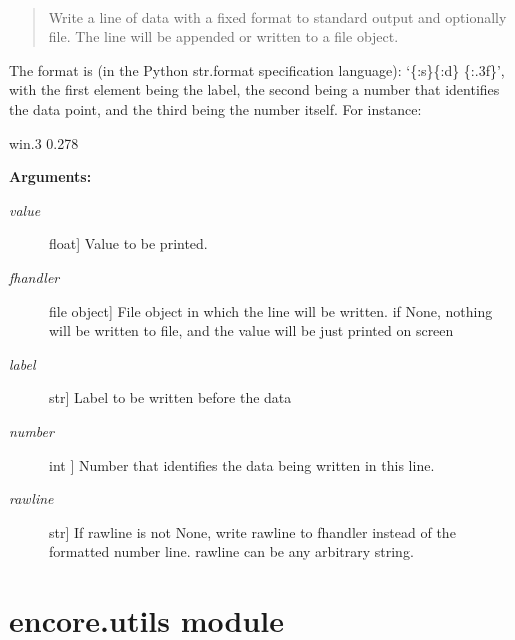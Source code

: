 \documentclass[letterpaper,10pt,english]{sphinxmanual}
\begin{document}

\begin{fulllineitems}
\label{index:encore.similarity.write_output_line}~\begin{quote}

Write a line of data with a fixed format to standard output and optionally file. The line will be appended or written to a file object.
\end{quote}

The format is (in the Python str.format specification language): `\{:s\}\{:d\}      \{:.3f\}', with the first element being the label, the second being
a number that identifies the data point, and the third being the number itself. For instance:

win.3   0.278

\textbf{Arguments:}
\begin{description}
\item[{\emph{value}}] \leavevmode{[}float{]}
Value to be printed.

\item[{\emph{fhandler}}] \leavevmode{[}file object{]}
File object in which the line will be written. if None, nothing will be written to file, and the value will be just printed on screen

\item[{\emph{label}}] \leavevmode{[}str{]}
Label to be written before the data

\item[{\emph{number}}] \leavevmode{[}int {]}
Number that identifies the data being written in this line.

\item[{\emph{rawline}}] \leavevmode{[}str{]}
If rawline is not None, write rawline to fhandler instead of the formatted number line. rawline can be any arbitrary string.

\end{description}

\end{fulllineitems}



\section{encore.utils module}
\label{index:encore-utils-module}\label{index:module-encore.utils}
\end{document}
